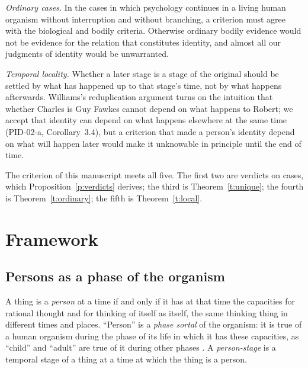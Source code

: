 \documentclass{situationist-preprint}
\begin{document}
\emph{Ordinary cases.} In the cases in which psychology continues in a living human organism without interruption and without branching, a criterion must agree with the biological and bodily criteria. Otherwise ordinary bodily evidence would not be evidence for the relation that constitutes identity, and almost all our judgments of identity would be unwarranted.

\emph{Temporal locality.} Whether a later stage is a stage of the original should be settled by what has happened up to that stage's time, not by what happens afterwards. Williams's reduplication argument turns on the intuition that whether Charles is Guy Fawkes cannot depend on what happens to Robert; we accept that identity can depend on what happens elsewhere at the same time (PID-02-a, Corollary~3.4), but a criterion that made a person's identity depend on what will happen later would make it unknowable in principle until the end of time.

The criterion of this manuscript meets all five. The first two are verdicts on cases, which Proposition~\ref{p:verdicts} derives; the third is Theorem~\ref{t:unique}; the fourth is Theorem~\ref{t:ordinary}; the fifth is Theorem~\ref{t:local}.

\section{Framework}\label{s:framework}

\subsection{Persons as a phase of the organism}

\begin{definition}[Person]\label{d:person}
A thing is a \emph{person} at a time if and only if it has at that time the capacities for rational thought and for thinking of itself as itself, the same thinking thing in different times and places. \enquote{Person} is a \emph{phase sortal} of the organism: it is true of a human organism during the phase of its life in which it has these capacities, as \enquote{child} and \enquote{adult} are true of it during other phases \citep{Wiggins1980}. A \emph{person-stage} is a temporal stage of a thing at a time at which the thing is a person.
\end{definition}
\end{document}
